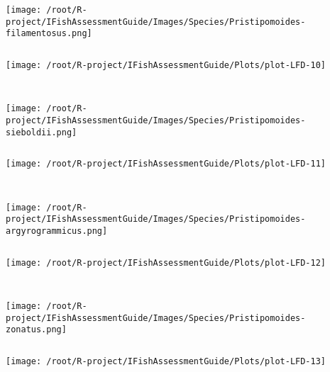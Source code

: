 \begin{knitrout}
\begin{kframe}
\begin{verbatim}
\end{verbatim}
\end{kframe}
\texttt{[image: /root/R-project/IFishAssessmentGuide/Images/Species/Pristipomoides-filamentosus.png]}
\begin{kframe}\begin{verbatim}
\end{verbatim}
\end{kframe}
\texttt{[image: /root/R-project/IFishAssessmentGuide/Plots/plot-LFD-10]} 
\begin{kframe}\begin{verbatim}
 
\end{verbatim}
\end{kframe}
\texttt{[image: /root/R-project/IFishAssessmentGuide/Images/Species/Pristipomoides-sieboldii.png]}
\begin{kframe}\begin{verbatim}
\end{verbatim}
\end{kframe}
\texttt{[image: /root/R-project/IFishAssessmentGuide/Plots/plot-LFD-11]} 
\begin{kframe}\begin{verbatim}
 
\end{verbatim}
\end{kframe}
\texttt{[image: /root/R-project/IFishAssessmentGuide/Images/Species/Pristipomoides-argyrogrammicus.png]}
\begin{kframe}\begin{verbatim}
\end{verbatim}
\end{kframe}
\texttt{[image: /root/R-project/IFishAssessmentGuide/Plots/plot-LFD-12]} 
\begin{kframe}\begin{verbatim}
 
\end{verbatim}
\end{kframe}
\texttt{[image: /root/R-project/IFishAssessmentGuide/Images/Species/Pristipomoides-zonatus.png]}
\begin{kframe}\begin{verbatim}
\end{verbatim}
\end{kframe}
\texttt{[image: /root/R-project/IFishAssessmentGuide/Plots/plot-LFD-13]} 
\begin{kframe}\begin{verbatim}
 

\end{verbatim}
\end{kframe}
\end{knitrout}
